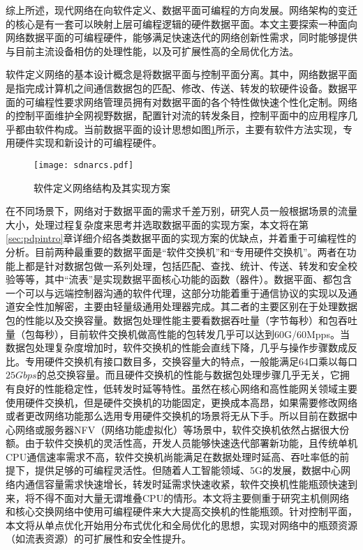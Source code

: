 综上所述，现代网络在向软件定义、数据平面可编程的方向发展。网络架构的变迁的核心是有一套可以映射上层可编程逻辑的硬件数据平面。本文主要探索一种面向网络数据平面的可编程硬件，能够满足快速迭代的网络创新性需求，同时能够提供与目前主流设备相仿的处理性能，以及可扩展性高的全局优化方法。


软件定义网络的基本设计概念是将数据平面与控制平面分离。其中，网络数据平面是指完成计算机之间通信数据包的匹配、修改、传送、转发的软硬件设备。数据平面的可编程性要求网络管理员拥有对数据平面的各个特性做快速个性化定制。网络的控制平面维护全网视野数据，配置针对流的转发条目，控制平面中的应用程序几乎都由软件构成。当前数据平面的设计思想如图\ref{sdnarcs}所示，主要有软件方法实现，专用硬件实现和新设计的可编程硬件。

\begin{figure}[!ht]
	\centering
	\texttt{[image: sdnarcs.pdf]}
	\caption{软件定义网络结构及其实现方案} \label{sdnarcs}
\end{figure}

在不同场景下，网络对于数据平面的需求千差万别，研究人员一般根据场景的流量大小，处理过程复杂度来思考并选取数据平面的实现方案，本文将在第\ref{sec:pdpintro}章详细介绍各类数据平面的实现方案的优缺点，并着重于可编程性的分析。目前两种最重要的数据平面是“软件交换机”和“专用硬件交换机”。两者在功能上都是针对数据包做一系列处理，包括匹配、查找、统计、传送、转发和安全校验等等，其中“流表”是实现数据平面核心功能的函数（器件）。数据平面、都包含一个可以与远端控制器沟通的软件代理，这部分功能着重于通信协议的实现以及通道安全性加解密，主要由轻量级通用处理器完成。其二者的主要区别在于处理数据包的性能以及交换容量。数据包处理性能主要看数据吞吐量（字节每秒）和包吞吐量（包每秒），目前软件交换机做高性能的包转发几乎可以达到60G/60Mpps。当数据包处理复杂度增加时，软件交换机的性能会直线下降，几乎与操作步骤数成反比。专用硬件交换机有接口数目多，交换容量大的特点，一般能满足64口乘以每口$25Gbps$的总交换容量。而且硬件交换机的性能与数据包处理步骤几乎无关，它拥有良好的性能稳定性，低转发时延等特性。虽然在核心网络和高性能网关领域主要使用硬件交换机，但是硬件交换机的功能固定，更换成本高昂，如果需要修改网络或者更改网络功能那么选用专用硬件交换机的场景将无从下手。所以目前在数据中心网络或服务器NFV（网络功能虚拟化）等场景中，软件交换机依然占据很大份额。由于软件交换机的灵活性高，开发人员能够快速迭代部署新功能，且传统单机CPU通信速率需求不高，软件交换机尚能满足在数据处理时延高、吞吐率低的前提下，提供足够的可编程灵活性。但随着人工智能领域、5G的发展，数据中心网络内通信容量需求快速增长，转发时延需求快速收紧，软件交换机性能瓶颈快速到来，将不得不面对大量无谓堆叠CPU的情形。本文将主要侧重于研究主机侧网络和核心交换网络中使用可编程硬件来大大提高交换机的性能瓶颈。针对控制平面，本文将从单点优化开始用分布式优化和全局优化的思想，实现对网络中的瓶颈资源（如流表资源）的可扩展性和安全性提升。

